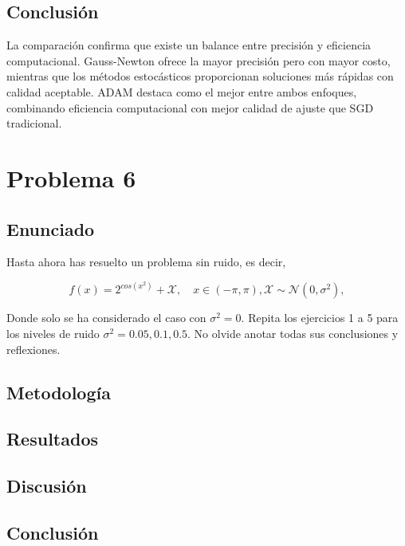 \documentclass{article}
\begin{document}
\subsection{Conclusión}

La comparación confirma que existe un balance entre precisión y eficiencia computacional. Gauss-Newton ofrece la mayor precisión pero con mayor costo, mientras que los métodos estocásticos proporcionan soluciones más rápidas con calidad aceptable. ADAM destaca como el mejor entre ambos enfoques, combinando eficiencia computacional con mejor calidad de ajuste que SGD tradicional.


\section{Problema 6}

\subsection{Enunciado}

Hasta ahora has resuelto un problema sin ruido, es decir,

\begin{equation*}
    f(x)=2^{cos(x^2)}+\mathcal{X}, \quad x \in (-\pi,\pi), \mathcal{X} \sim \mathcal{N}(0,\sigma^{2}),
\end{equation*}

Donde solo se ha considerado el caso con $\sigma^2=0$. Repita los ejercicios 1 a 5 para los niveles de ruido $\sigma^2 = 0.05,0.1,0.5$. No olvide anotar todas sus conclusiones y reflexiones.

\subsection{Metodología}

\subsection{Resultados}
\setcounter{equation}{0}

\subsection{Discusión}

\subsection{Conclusión}
\end{document}
